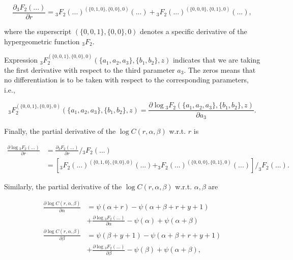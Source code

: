 \documentclass[11pt]{article}
\begin{document}
\begin{equation}
	\frac{\partial {}_3F_2(...)}{\partial r} = {}_3F_2(...)^{(\{0,1,0\},\{0,0\},0)}(...) + {}_3F_2(...)^{(\{0,0,0\},\{0,1\},0)}(...),
\end{equation}

where the superscript \( (\{0,0,1\},\{0,0\},0) \) denotes a specific derivative of the  hypergeometric function \( {}_3F_2 \). 

Expression \( {}_3F_2^{(\{0,0,1\},\{0,0\},0)}(\{a_1,a_2,a_3\},\{b_1,b_2\},z) \) indicates that we are taking the first derivative with respect to the third parameter \( a_3 \). The zeros means that no differentiation is to be taken with respect to the corresponding parameters, i.e.,

\begin{equation}
	{}_3F_2^{(\{0,0,1\},\{0,0\},0)}(\{a_1,a_2,a_3\},\{b_1,b_2\},z) = \frac{\partial \log {}_3F_2(\{a_1,a_2,a_3\},\{b_1,b_2\},z)}{\partial a_3}.
\end{equation}

Finally, the partial derivative of the $\log C(r,\alpha,\beta)$ w.r.t. $r$ is

\begin{equation}
\begin{aligned}
	\frac{\partial \log {}_3F_2(...)}{\partial r} &=  \frac{\partial {}_3F_2(...)}{\partial r} /  {}_3F_2(...) \\
	&= \left[ _3F_2(...)^{(\{0,1,0\},\{0,0\},0)}(...) + _3F_2(...)^{(\{0,0,0\},\{0,1\},0)}(...) \right]  / _3F_2(...).
\end{aligned}
\end{equation}




Similarly, the partial derivative of the $\log C(r,\alpha,\beta)$ w.r.t. $\alpha, \beta$ are

\begin{equation}
  \begin{aligned}
\frac{\partial \log C(r,\alpha,\beta)}{\partial \alpha} &= \psi(\alpha+r) - \psi(\alpha+\beta+r+y+1)  \\
&+ \frac{\partial \log {}_3F_2(...)}{\partial \alpha} - \psi(\alpha) + \psi(\alpha+\beta) \\
\frac{\partial \log C(r,\alpha,\beta)}{\partial \beta} &= \psi(\beta+y+1) - \psi(\alpha+\beta+r+y+1)  \\
&+ \frac{\partial \log {}_3F_2(...)}{\partial \beta} - \psi(\beta) + \psi(\alpha+\beta), 
  \end{aligned}
\end{equation}
\end{document}
